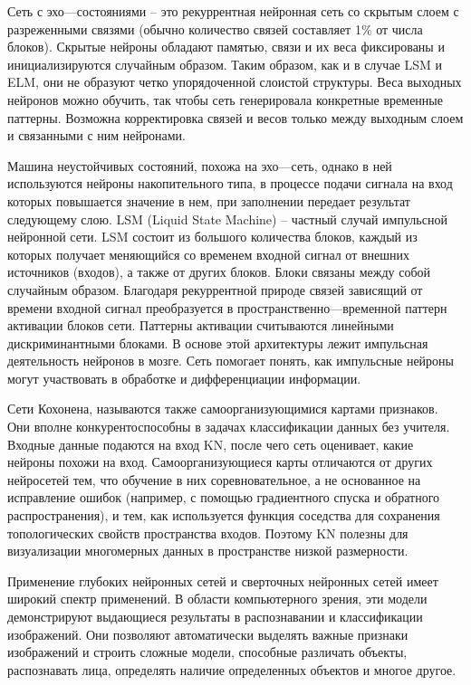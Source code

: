     Сеть с эхо—состояниями – это рекуррентная нейронная сеть со скрытым слоем с разреженными связями (обычно количество связей составляет 1\% от числа блоков). Скрытые нейроны обладают памятью, связи и их веса фиксированы и инициализируются случайным образом. Таким образом, как и в случае LSM и ELM, они не образуют четко упорядоченной слоистой структуры. Веса выходных нейронов можно обучить, так чтобы сеть генерировала конкретные временные паттерны. Возможна корректировка связей и весов только между выходным слоем и связанными с ним нейронами.
    
    Машина неустойчивых состояний, похожа на эхо—сеть, однако в ней используются нейроны накопительного типа, в процессе подачи сигнала на вход которых повышается значение в нем, при заполнении передает результат следующему слою. LSM (Liquid State Machine) – частный случай импульсной нейронной сети. LSM состоит из большого количества блоков, каждый из которых получает меняющийся со временем входной сигнал от внешних источников (входов), а также от других блоков. Блоки связаны между собой случайным образом. Благодаря рекуррентной природе связей зависящий от времени входной сигнал преобразуется в пространственно—временной паттерн активации блоков сети. Паттерны активации считываются линейными дискриминантными блоками. В основе этой архитектуры лежит импульсная деятельность нейронов в мозге. Сеть помогает понять, как импульсные нейроны могут участвовать в обработке и дифференциации информации.
    
    Сети Кохонена, называются также самоорганизующимися картами признаков. Они вполне конкурентоспособны в задачах классификации данных без учителя. Входные данные подаются на вход KN, после чего сеть оценивает, какие нейроны похожи на вход. Самоорганизующиеся карты отличаются от других нейросетей тем, что обучение в них соревновательное, а не основанное на исправление ошибок (например, с помощью градиентного спуска и обратного распространения), и тем, как используется функция соседства для сохранения топологических свойств пространства входов. Поэтому KN полезны для визуализации многомерных данных в пространстве низкой размерности.
    
    Применение глубоких нейронных сетей и сверточных нейронных сетей имеет широкий спектр применений. В области компьютерного зрения, эти модели демонстрируют выдающиеся результаты в распознавании и классификации изображений. Они позволяют автоматически выделять важные признаки изображений и строить сложные модели, способные различать объекты, распознавать лица, определять наличие определенных объектов и многое другое.
    
